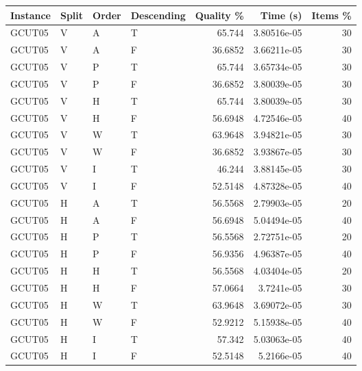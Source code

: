 \begin{tabular}{llllrrr}
    \hline
    Instance & Split & Order & Descending & Quality \% & Time (s)    & Items \% \\
    \hline
    GCUT05   & V     & A     & T          & 65.744     & 3.80516e-05 & 30       \\
    GCUT05   & V     & A     & F          & 36.6852    & 3.66211e-05 & 30       \\
    GCUT05   & V     & P     & T          & 65.744     & 3.65734e-05 & 30       \\
    GCUT05   & V     & P     & F          & 36.6852    & 3.80039e-05 & 30       \\
    GCUT05   & V     & H     & T          & 65.744     & 3.80039e-05 & 30       \\
    GCUT05   & V     & H     & F          & 56.6948    & 4.72546e-05 & 40       \\
    GCUT05   & V     & W     & T          & 63.9648    & 3.94821e-05 & 30       \\
    GCUT05   & V     & W     & F          & 36.6852    & 3.93867e-05 & 30       \\
    GCUT05   & V     & I     & T          & 46.244     & 3.88145e-05 & 30       \\
    GCUT05   & V     & I     & F          & 52.5148    & 4.87328e-05 & 40       \\
    GCUT05   & H     & A     & T          & 56.5568    & 2.79903e-05 & 20       \\
    GCUT05   & H     & A     & F          & 56.6948    & 5.04494e-05 & 40       \\
    GCUT05   & H     & P     & T          & 56.5568    & 2.72751e-05 & 20       \\
    GCUT05   & H     & P     & F          & 56.9356    & 4.96387e-05 & 40       \\
    GCUT05   & H     & H     & T          & 56.5568    & 4.03404e-05 & 20       \\
    GCUT05   & H     & H     & F          & 57.0664    & 3.7241e-05  & 30       \\
    GCUT05   & H     & W     & T          & 63.9648    & 3.69072e-05 & 30       \\
    GCUT05   & H     & W     & F          & 52.9212    & 5.15938e-05 & 40       \\
    GCUT05   & H     & I     & T          & 57.342     & 5.03063e-05 & 40       \\
    GCUT05   & H     & I     & F          & 52.5148    & 5.2166e-05  & 40       \\

\end{tabular}
